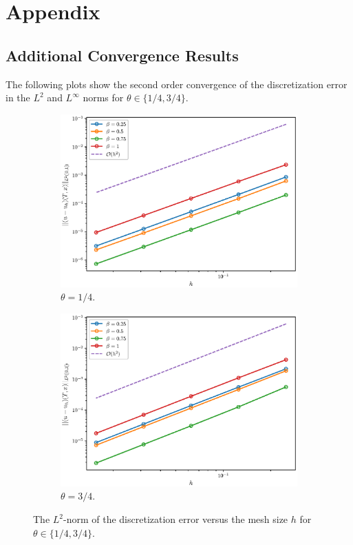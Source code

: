 \newpage
\section{Appendix}
\subsection{Additional Convergence Results}
The following plots show the second order convergence of the discretization error in the $L^2$ and $L^{\infty}$ norms for $\theta \in \{1/4, 3/4 \}$.
\begin{figure}[h]
\centering
\begin{subfigure}{0.5\textwidth}
  \centering
  \includegraphics[width=1\linewidth]{figures/theta1o4/l2.eps}
  \caption{$\theta=1/4$.}
  \label{fig:sub1}
\end{subfigure}%
\begin{subfigure}{0.5\textwidth}
  \centering
  \includegraphics[width=1\linewidth]{figures/theta3o4/l2.eps}
  \caption{$\theta=3/4$.}
  \label{fig:sub2}
\end{subfigure}
\caption{The $L^{2}$-norm of the discretization error versus the mesh size $h$ for $\theta \in \{1/4, 3/4 \}$. }
\label{fig:sub2}
\end{figure}

